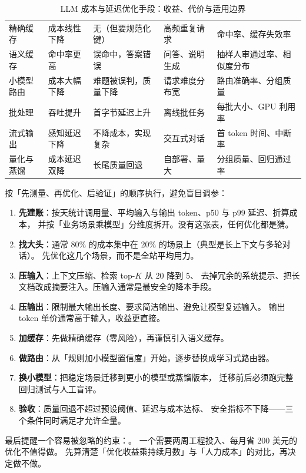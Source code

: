 \begin{table}[htbp]
\centering
\caption{LLM 成本与延迟优化手段：收益、代价与适用边界}
\label{tab:llm-optimize}
\small
\begin{tabularx}{\textwidth}{L{2.0cm} L{2.0cm} L{2.2cm} L{2.0cm} Y}
\toprule
{} &  &  &  &  \\
\midrule
精确缓存 & 成本线性下降 & 无（但要规范化键） & 高频重复请求 & 命中率、缓存失效率 \\
\addlinespace
语义缓存 & 命中率更高 & 误命中，答案错误 & 问答、说明生成 & 抽样人审通过率、相似度分布 \\
\addlinespace
小模型路由 & 成本大幅下降 & 难题被误判，质量下降 & 请求难度分布宽 & 路由准确率、分组质量 \\
\addlinespace
批处理 & 吞吐提升 & 首字节延迟上升 & 离线批任务 & 每批大小、GPU 利用率 \\
\addlinespace
流式输出 & 感知延迟下降 & 不降成本，实现复杂 & 交互式对话 & 首 token 时间、中断率 \\
\addlinespace
量化与蒸馏 & 成本延迟双降 & 长尾质量回退 & 自部署、量大 & 分组质量、回归通过率 \\
\bottomrule
\end{tabularx}
\end{table}

\begin{toolbox}
按「先测量、再优化、后验证」的顺序执行，避免盲目调参：
\begin{enumerate}
  \item \textbf{先建账}：按天统计调用量、平均输入与输出 token、p50 与 p99 延迟、折算成本，
        并按「业务场景乘模型」分维度拆开。没有这张表，任何优化都是猜。
  \item \textbf{找大头}：通常 80\% 的成本集中在 20\% 的场景上（典型是长上下文与多轮对话）。
        先优化这几个场景，而不是全站平均用力。
  \item \textbf{压输入}：上下文压缩、检索 top-$K$ 从 20 降到 5、
        去掉冗余的系统提示、把长文档改成摘要注入。压输入通常是最安全的降本手段。
  \item \textbf{压输出}：限制最大输出长度、要求简洁输出、避免让模型复述输入。
        输出 token 单价通常高于输入，收益更直接。
  \item \textbf{加缓存}：先做精确缓存（零风险），再谨慎引入语义缓存。
  \item \textbf{做路由}：从「规则加小模型置信度」开始，逐步替换成学习式路由器。
  \item \textbf{换小模型}：把稳定场景迁移到更小的模型或蒸馏版本，
        迁移前后必须跑完整回归测试与人工盲评。
  \item \textbf{验收}：质量回退不超过预设阈值、延迟与成本达标、
        安全指标不下降——三个条件同时满足才允许全量。
\end{enumerate}
最后提醒一个容易被忽略的约束：。
一个需要两周工程投入、每月省 200 美元的优化不值得做。
先算清楚「优化收益乘持续月数」与「人力成本」的对比，再决定做不做。
\end{toolbox}

